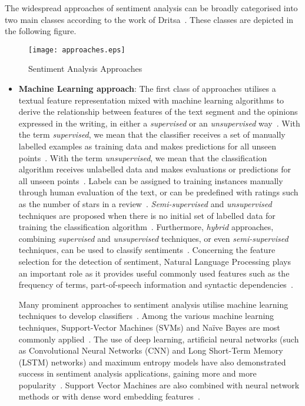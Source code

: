 The widespread approaches of sentiment analysis can be broadly categorised
into two main classes according to the work of Dritsa~\cite{Dri18}.
These classes are depicted in the following figure.

\begin{figure}[ht]
\centering
\texttt{[image: approaches.eps]}
\caption{Sentiment Analysis Approaches}
\label{fig:approaches}
\end{figure}

\clearpage

\begin{itemize}
 \item \textbf{Machine Learning approach}:
 The first class of approaches utilises a textual feature representation
 mixed with machine learning algorithms
 to derive the relationship between features of the text segment
 and the opinions expressed in the writing,
 in either a \emph{supervised} or an \emph{unsupervised} way~\cite{GSZ13,PLV02}.
 With the term \emph{supervised},
 we mean that the classifier receives a set of manually labelled examples
 as training data and makes predictions for all unseen points~\cite{MRT12}.
 With the term \emph{unsupervised},
 we mean that the classification algorithm receives unlabelled data
 and makes evaluations or predictions for all unseen points~\cite{MRT12}.
 Labels can be assigned to training instances manually
 through human evaluation of the text, or can be predefined with ratings
 such as the number of stars in a review~\cite{GSZ13}.
 \emph{Semi-supervised} and \emph{unsupervised} techniques are proposed
 when there is no initial set of labelled data
 for training the classification algorithm~\cite{HZ11,XGYZ13}.
 Furthermore, \emph{hybrid} approaches,
 combining \emph{supervised} and \emph{unsupervised} techniques,
 or even \emph{semi-supervised} techniques,
 can be used to classify sentiments~\cite{KL14,KB06}.
 Concerning the feature selection for the detection of sentiment,
 Natural Language Processing plays an important role
 as it provides useful commonly used features
 such as the frequency of terms, part-of-speech information
 and syntactic dependencies~\cite{SORH15}.
 
 Many prominent approaches to sentiment analysis utilise
 machine learning techniques to develop classifiers~\cite{DLP03,PLV02,ACS08,Gam04}.
 Among the various machine learning techniques,
 Support-Vector Machines (SVMs) and Na\"{i}ve Bayes are most commonly
 applied~\cite{SORH15,GSZ13,PLV02}.
 The use of deep learning, artificial neural networks
 (such as Convolutional Neural Networks (CNN)
 and Long Short-Term Memory (LSTM) networks)
 and maximum entropy models have also demonstrated success
 in sentiment analysis applications, gaining more and more popularity~\cite{GSZ13}.
 Support Vector Machines are also combined with neural network methods
 or with dense word embedding features~\cite{RFN17,GSZ13}.
 

\end{itemize}
